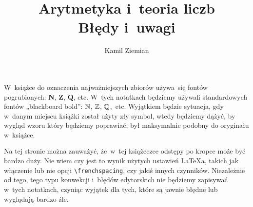 \documentclass[a4paper,11pt]{article}
\title{Arytmetyka i~teoria liczb \\
  {\Large Błędy i~uwagi}}
\author{Kamil Ziemian}
\begin{document}





\maketitle %






\vspace{0em}



\vspace{0em}


\noindent
W~książce do oznaczenia najważniejszych zbiorów używa~się fontów
pogrubionych: $\mathbf{N}$, $\mathbf{Z}$, $\mathbf{Q}$, etc. W~tych
notatkach będziemy używali standardowych fontów „blackboard bold”: $\mathbb{N}$,
$\mathbb{Z}$, $\mathbb{Q}$,~etc. Wyjątkiem będzie sytuacja, gdy w~danym miejscu
książki został użyty zły symbol, wtedy będziemy dążyć, by wygląd wzoru który
będziemy poprawiać, był maksymalnie podobny do oryginału w~książce.

\vspace{\spaceFour}






\vspace{0em}


 Na tej stronie można zauważyć, że~w~tej książeczce odstępy po kropce
może być bardzo duży. Nie wiem czy jest to wynik użytych ustawień \LaTeX a,
takich jak włączenie lub nie opcji \texttt{\textbackslash frenchspacing},
czy jakiś innych czynników. Niezależnie od tego, tego typu konwekcji
i~błędów edytorskich nie będziemy zapisywać w~tych notatkach, czyniąc
wyjątek dla tych, które są jawnie błędne lub wyglądają bardzo źle.

\vspace{\spaceFour}
\end{document}
